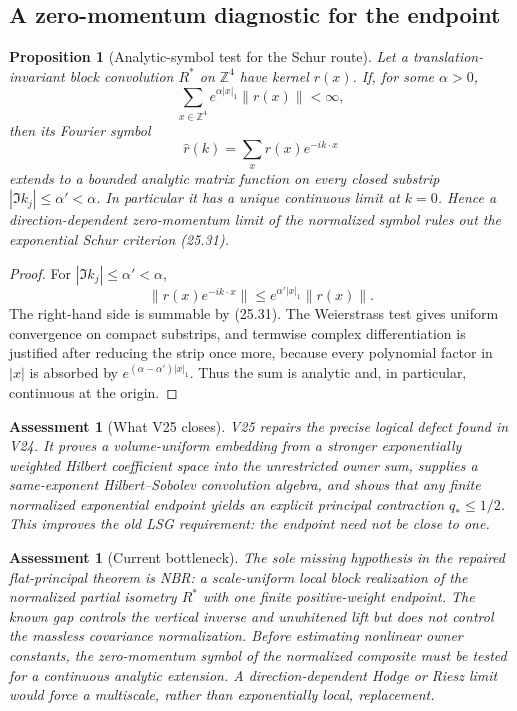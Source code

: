 \documentclass[11pt,oneside]{book}
\newtheorem{proposition}[theorem]{Proposition}
\newtheorem{assessment}[theorem]{Assessment}
\theoremstyle{definition}
\theoremstyle{remark}
\begin{document}
\subsection{A zero-momentum diagnostic for the endpoint}

\begin{proposition}[Analytic-symbol test for the Schur route]
\label{prop:e8v25-symbol-test}
Let a translation-invariant block convolution \(R^*\) on
\({\mathbb Z}^4\) have kernel \(r(x)\).  If, for some \(\alpha>0\),
\[
                    \sum_{x\in{\mathbb Z}^4}
                    e^{\alpha|x|_1}\|r(x)\|<\infty,               \tag{25.31}
\]
then its Fourier symbol
\[
                    \widehat r(k)=\sum_xr(x)e^{-ik\cdot x}        \tag{25.32}
\]
extends to a bounded analytic matrix function on every closed
substrip \(|\Im k_j|\leq\alpha'<\alpha\).  In particular it has a
unique continuous limit at \(k=0\).  Hence a direction-dependent
zero-momentum limit of the normalized symbol rules out the
exponential Schur criterion (25.31).
\end{proposition}

\begin{proof}
For \(|\Im k_j|\leq\alpha'<\alpha\),
\[
 \|r(x)e^{-ik\cdot x}\|
 \leq e^{\alpha'|x|_1}\|r(x)\|.
\]
The right-hand side is summable by (25.31).  The Weierstrass test gives
uniform convergence on compact substrips, and termwise complex
differentiation is justified after reducing the strip once more,
because every polynomial factor in \(|x|\) is absorbed by
\(e^{(\alpha-\alpha')|x|_1}\).  Thus the sum is analytic and, in
particular, continuous at the origin.
\end{proof}

\begin{assessment}[What V25 closes]
\label{ass:e8v25-closes}
V25 repairs the precise logical defect found in V24.  It proves a
volume-uniform embedding from a stronger exponentially weighted
Hilbert coefficient space into the unrestricted owner sum, supplies a
same-exponent Hilbert--Sobolev convolution algebra, and shows that any
finite normalized exponential endpoint yields an explicit principal
contraction \(q_*\leq1/2\).  This improves the old LSG requirement:
the endpoint need not be close to one.
\end{assessment}

\begin{assessment}[Current bottleneck]
\label{ass:e8v25-remains}
The sole missing hypothesis in the repaired flat-principal theorem is
NBR: a scale-uniform local block realization of the normalized
partial isometry \(R^*\) with one finite positive-weight endpoint.
The known gap controls the vertical inverse and unwhitened lift but
does not control the massless covariance normalization.  Before
estimating nonlinear owner constants, the zero-momentum symbol of the
normalized composite must be tested for a continuous analytic
extension.  A direction-dependent Hodge or Riesz limit would force a
multiscale, rather than exponentially local, replacement.
\end{assessment}
\end{document}
